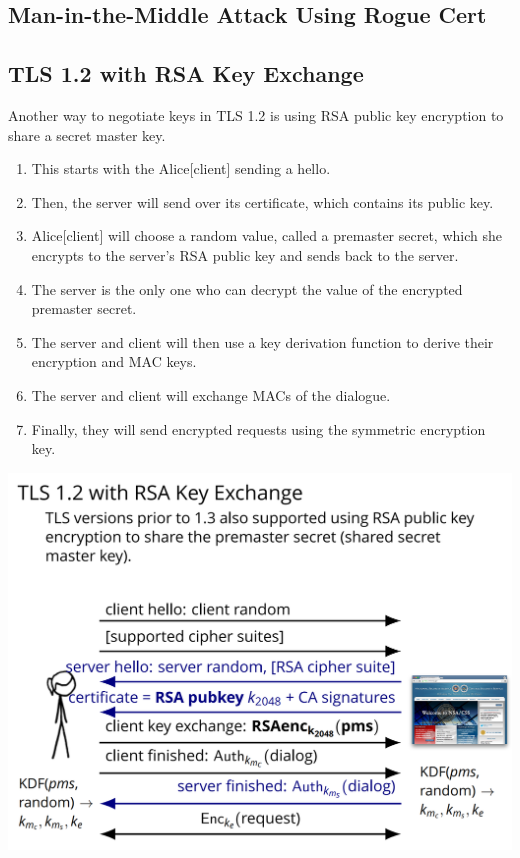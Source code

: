 \documentclass[11pt]{article} %
\begin{document}
\subsection{Man-in-the-Middle Attack Using Rogue Cert}

\newpage
\subsection{TLS 1.2 with RSA Key Exchange}
Another way to negotiate keys in TLS 1.2 is using RSA public key encryption to 
share a secret master key.

\begin{enumerate}
  \item This starts with the Alice[client] sending a hello.
  \item Then, the server will send over its certificate, which contains its 
  public key.
  \item Alice[client] will choose a random value, called a premaster secret, 
  which she encrypts to the server's RSA public key and sends back to the 
  server.
  \item The server is the only one who can decrypt the value of the encrypted 
  premaster secret.
  \item The server and client will then use a key derivation function to 
  derive their encryption and MAC keys.
  \item The server and client will exchange MACs of the dialogue.
  \item Finally, they will send encrypted requests using the symmetric 
  encryption key.
\end{enumerate}

\includegraphics[scale=.6]{./TLS_RSA.png}
\end{document}

